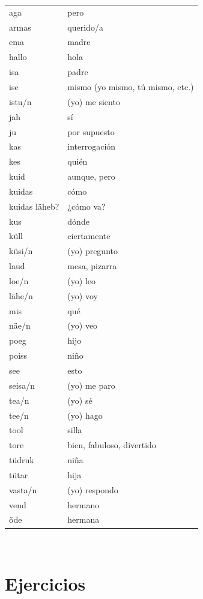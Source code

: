 \begin{tabular}{ l l }
	aga				& pero \\
	armas			& querido/a \\
	ema				& madre \\
	hallo			& hola \\
	isa				& padre \\
	ise				& mismo (yo mismo, tú mismo, etc.) \\
	istu/n			& (yo) me siento  \\
	jah				& sí \\
	ju				& por supuesto \\
	kas				& interrogación \\
	kes				& quién \\
	kuid			& aunque, pero \\
	kuidas			& cómo \\
	kuidas läheb?	& ¿cómo va? \\
	kus				& dónde \\
	küll			& ciertamente \\
	küsi/n			& (yo) pregunto \\
	laud			& mesa, pizarra \\
	loe/n			& (yo) leo \\
	lähe/n			& (yo) voy \\
	mis				& qué \\
	näe/n			& (yo) veo \\
	poeg			& hijo \\
	poiss			& niño \\
	see				& esto \\
	seisa/n			& (yo) me paro \\
	tea/n			& (yo) sé \\
	tee/n			& (yo) hago \\
	tool			& silla \\
	tore			& bien, fabuloso, divertido \\
	tüdruk			& niña \\
	tütar			& hija \\
	vasta/n			& (yo) respondo \\
	vend			& hermano \\
	õde				& hermana
\end{tabular}\\ \bigskip

\section*{\Large{Ejercicios}}

